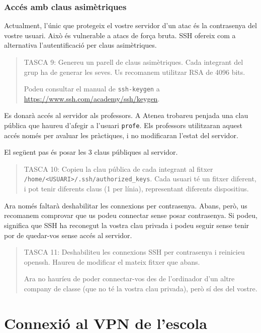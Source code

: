\documentclass{practicaitic}
\begin{document}
\subsubsection{Accés amb claus asimètriques}

Actualment, l'únic que protegeix el vostre servidor d'un atac és la contrasenya
del vostre usuari. Això és vulnerable a atacs de força bruta. SSH ofereix com a
alternativa l'autentificació per claus asimètriques.

\begin{quote}
TASCA 9: Genereu un parell de claus asimètriques. Cada integrant del grup ha de
generar les seves. Us recomanem utilitzar RSA de 4096 bits.

Podeu consultar el manual de \texttt{ssh-keygen} a
\url{https://www.ssh.com/academy/ssh/keygen}.
\end{quote}

Es donarà accés al servidor als professors. A Atenea trobareu penjada
una clau pública que haureu d'afegir a l'usuari \texttt{profe}. Els professors
utilitzaran aquest accés només per avaluar les pràctiques, i no modificaran
l'estat del servidor.

El següent pas
és posar les 3 claus públiques al servidor.

\begin{quote}
TASCA 10: Copieu la clau pública de cada integrant al fitxer
\texttt{/home/<USUARI>/.ssh/authorized\_keys}. Cada usuari té un fitxer diferent,
i pot tenir diferents claus (1 per línia), representant diferents dispositius.
\end{quote}

Ara només faltarà deshabilitar les connexions per contrasenya. Abans, però, us
recomanem comprovar que us podeu connectar sense posar contrasenya. Si podeu,
significa que SSH ha reconegut la vostra clau privada i podeu seguir sense
tenir por de quedar-vos sense accés al servidor.

\begin{quote}
TASCA 11: Deshabiliteu les connexions SSH per contrasenya i reinicieu openssh.
Haureu de modificar el mateix fitxer que abans.

Ara no hauríeu de poder connectar-vos des de l'ordinador d'un altre company
de classe (que no té la vostra clau privada), però sí des del vostre.
\end{quote}

\section{Connexió al VPN de l'escola}
\end{document}
